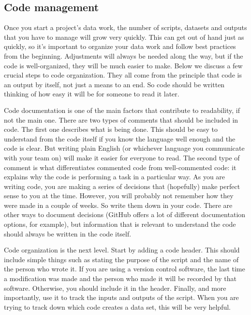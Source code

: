\subsection{Code management}

Once you start a project's data work, 
the number of scripts, datasets and outputs that you have to manage will grow very quickly. 
This can get out of hand just as quickly, 
so it's important to organize your data work and follow best practices from the beginning. 
Adjustments will always be needed along the way, 
but if the code is well-organized, they will be much easier to make.
Below we discuss a few crucial steps to code organization.
They all come from the principle that code is an output by itself, 
not just a means to an end. 
So code should be written thinking of how easy it will be for someone to read it later.

Code documentation is one of the main factors that contribute to readability, 
if not the main one. 
There are two types of comments that should be included in code. 
The first one describes what is being done. 
This should be easy to understand from the code itself if you know the language well enough and the code is clear. 
But writing plain English (or whichever language you communicate with your team on) 
will make it easier for everyone to read. 
The second type of comment is what differentiates commented code from well-commented code:
it explains why the code is performing a task in a particular way. 
As you are writing code, you are making a series of decisions that 
(hopefully) make perfect sense to you at the time. 
However, you will probably not remember how they were made in a couple of weeks. 
So write them down in your code. 
There are other ways to document decisions 
(GitHub offers a lot of different documentation options, for example), 
but information that is relevant to understand the code should always be written in the code itself.

Code organization is the next level. 
Start by adding a code header. 
This should include simple things such as stating the purpose of the script and the name of the person who wrote it. 
If you are using a version control software, 
the last time a modification was made and the person who made it will be recorded by that software. 
Otherwise, you should include it in the header. 
Finally, and more importantly, use it to track the inputs and outputs of the script. 
When you are trying to track down which code creates a data set, this will be very helpful. 
 
